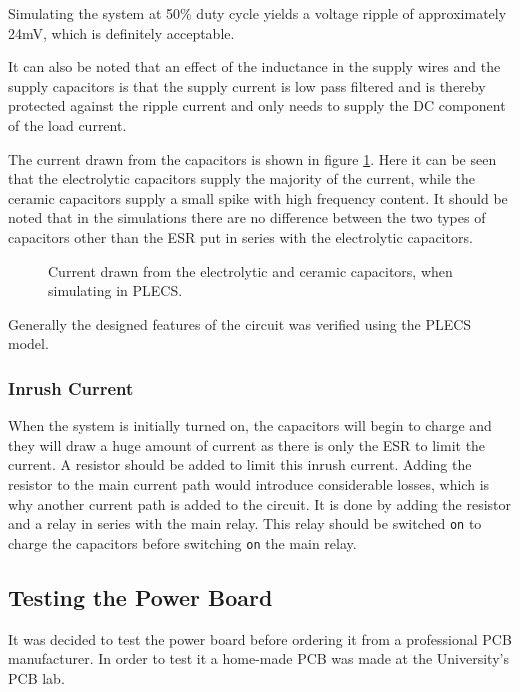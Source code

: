Simulating the system at 50\% duty cycle yields a voltage ripple of approximately 24mV, which is definitely acceptable. 

It can also be noted that an effect of the inductance in the supply wires and the supply capacitors is that the supply current is low pass filtered and is thereby protected against the ripple current and only needs to supply the DC component of the load current.

The current drawn from the capacitors is shown in figure \ref{fig:cap_currents}.
Here it can be seen that the electrolytic capacitors supply the majority of the current, while the ceramic capacitors supply a small spike with high frequency content.
It should be noted that in the simulations there are no difference between the two types of capacitors other than the ESR put in series with the electrolytic capacitors. 

\begin{figure}[h]
	\centering
	\caption{Current drawn from the electrolytic and ceramic capacitors, when simulating in PLECS. }
	\label{fig:cap_currents}
\end{figure}

Generally the designed features of the circuit was verified using the PLECS model.

\subsubsection{Inrush Current}
\label{ssub:inrush_current}
When the system is initially turned on, the capacitors will begin to charge and they will draw a huge amount of current as there is only the ESR to limit the current. 
A resistor should be added to limit this inrush current. 
Adding the resistor to the main current path would introduce considerable losses, which is why another current path is added to the circuit.
It is done by adding the resistor and a relay in series with the main relay. 
This relay should be switched \texttt{on} to charge the capacitors before switching \texttt{on} the main relay.


\subsection{Testing the Power Board}
It was decided to test the power board before ordering it from a professional PCB manufacturer.
In order to test it a home-made PCB was made at the University's PCB lab.


